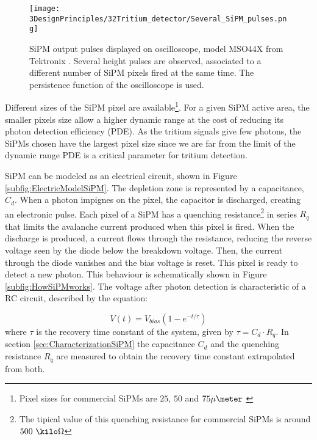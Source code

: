 \begin{figure}[h]
\centering
\texttt{[image: 3DesignPrinciples/32Tritium\_detector/Several\_SiPM\_pulses.png]}
\caption{SiPM output pulses displayed on oscilloscope, model MSO44X from Tektronix \cite{Oscilloscope}. Several height pulses are observed, associated to a different number of  SiPM pixels fired at the same time. The persistence function of the oscilloscope is used.\label{fig:PulsesOfSiPM}}
\end{figure}

Different sizes of the SiPM pixel are available\footnote{Pixel sizes for commercial SiPMs are $25$, $50$ and $75\mu\meter$ \cite{DataSheetHammamatsu_1_SiPM_25, DataSheetHammamatsu_1_SiPM_50, DataSheetHammamatsu_1_SiPM_75}}. For a given SiPM active area, the smaller pixels size allow a higher dynamic range at the cost of reducing its photon detection efficiency (PDE). As the tritium signals give few photons, the SiPMs chosen have the largest pixel size since we are far from the limit of the dynamic range PDE is a critical parameter for tritium detection.


SiPM can be modeled as an electrical circuit, shown in Figure \ref{subfig:ElectricModelSiPM}. The depletion zone is represented by a capacitance, $C_d$. When a photon impignes on the pixel, the capacitor is discharged, creating an electronic pulse. Each pixel of a SiPM has a quenching resistance\footnote{The tipical value of this quenching resistance for commercial SiPMs is around $500~\kilo\Omega$} in series $R_q$ that limits the avalanche current produced when this pixel is fired. When the discharge is produced, a current flows through the resistance, reducing the reverse voltage seen by the diode below the breakdown voltage. Then, the current through the diode vanishes and the bias voltage is reset. This pixel is ready to detect a new photon. This behaviour is schematically shown in Figure \ref{subfig:HowSiPMworks}. The voltage after photon detection is characteristic of a RC circuit, described by the equation: 

\begin{equation}
V(t)=V_{bias}\left(1-e^{-t/\tau} \right)
\label{RCCircuitBiasVoltage}
\end{equation}
where $\tau$ is the recovery time constant of the system, given by $\tau=C_d \cdot{} R_q$. In section \ref{sec:CharacterizationSiPM} the capacitance $C_d$ and the quenching resistance $R_q$ are measured to obtain the recovery time constant extrapolated from both.

